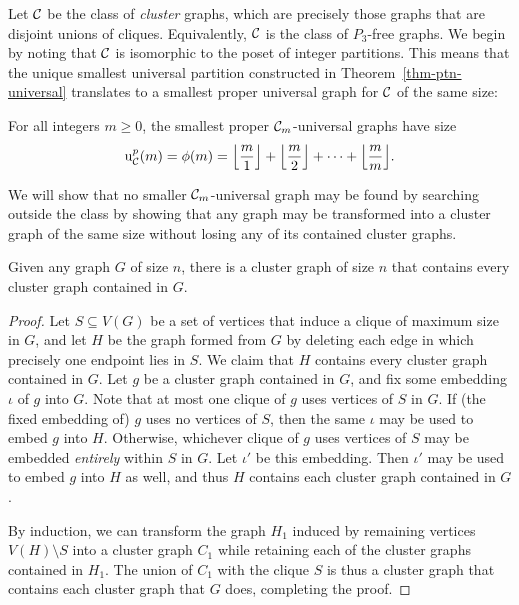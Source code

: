Let $\mathcal{C}$ be the class of \emph{cluster} graphs, which are precisely those graphs that are disjoint unions of cliques. Equivalently, $\mathcal{C}$ is the class of $P_3$-free graphs. We begin by noting that $\mathcal{C}$ is isomorphic to the poset of integer partitions. This means that the unique smallest universal partition constructed in Theorem~\ref{thm-ptn-universal} translates to a smallest proper universal graph for $\mathcal{C}$ of the same size:
\begin{proposition}
\label{prop-graph-cluster-proper}
For all integers $m \ge 0$, the smallest proper $\mathcal{C}_m$-universal graphs have size 
\[
	\operatorname{u}_{\mathcal{C}}^p(m)
	=
	\phi(m)
	=
	{\left\lfloor{\dfrac{m}{1}}\right\rfloor} + {\left\lfloor{\dfrac{m}{2}}\right\rfloor} + \cdots + {\left\lfloor{\dfrac{m}{m}}\right\rfloor}.
\]
\end{proposition}

We will show that no smaller $\mathcal{C}_m$-universal graph may be found by searching outside the class by showing that any graph may be transformed into a cluster graph of the same size without losing any of its contained cluster graphs.

\begin{proposition}
\label{prop-clusterize}
	Given any graph $G$ of size $n$, there is a cluster graph of size $n$ that contains every cluster graph contained in $G$.
\end{proposition}
\begin{proof}
	Let $S \subseteq V(G)$ be a set of vertices that induce a clique of maximum size in $G$, and let $H$ be the graph formed from $G$ by deleting each edge in which precisely one endpoint lies in $S$. We claim that $H$ contains every cluster graph contained in $G$. Let $g$ be a cluster graph contained in $G$, and fix some embedding $\iota$ of $g$ into $G$. Note that at most one clique of $g$ uses vertices of $S$ in $G$. If (the fixed embedding of) $g$ uses no vertices of $S$, then the same $\iota$ may be used to embed $g$ into $H$. Otherwise, whichever clique of $g$ uses vertices of $S$ may be embedded \emph{entirely} within $S$ in $G$. Let $\iota'$ be this embedding. Then $\iota'$ may be used to embed $g$ into $H$ as well, and thus $H$ contains each cluster graph contained in $G$. 
	
	By induction, we can transform the graph $H_1$ induced by remaining vertices $V(H) \setminus S$ into a cluster graph $C_1$ while retaining each of the cluster graphs contained in $H_1$. The union of $C_1$ with the clique $S$ is thus a cluster graph that contains each cluster graph that $G$ does, completing the proof.
\end{proof}

